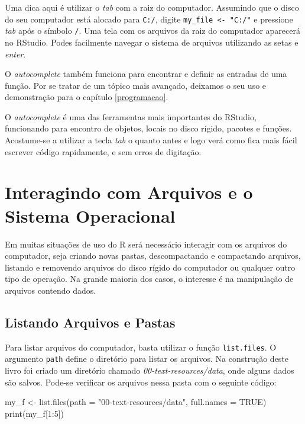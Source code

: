 \documentclass[
  11pt,
]{book}
\newenvironment{Shaded}{\begin{snugshade}}{\end{snugshade}}
\newcommand{\AttributeTok}[1]{\textcolor[rgb]{0.61,0.61,0.61}{#1}}
\newcommand{\ConstantTok}[1]{\textcolor[rgb]{0,0,0}{#1}}
\newcommand{\DecValTok}[1]{\textcolor[rgb]{0.06,0.06,0.06}{#1}}
\newcommand{\FunctionTok}[1]{\textcolor[rgb]{0,0,0}{#1}}
\newcommand{\NormalTok}[1]{#1}
\newcommand{\OtherTok}[1]{\textcolor[rgb]{0.37,0.37,0.37}{#1}}
\newcommand{\SpecialCharTok}[1]{\textcolor[rgb]{0,0,0}{#1}}
\newcommand{\StringTok}[1]{\textcolor[rgb]{0.5,0.5,0.5}{#1}}
\newenvironment{rmdimportant}
{\begin{importantblock}

	} {\end{importantblock}}
\begin{document}
Uma dica aqui é utilizar o \emph{tab} com a raiz do computador. Assumindo que o disco do seu computador está alocado para \texttt{C:/}, digite \texttt{my\_file\ \textless{}-\ "C:/"} e pressione \emph{tab} após o símbolo \texttt{/}. Uma tela com os arquivos da raiz do computador aparecerá no RStudio. Podes facilmente navegar o sistema de arquivos utilizando as setas e \emph{enter}.

O \emph{autocomplete} também funciona para encontrar e definir as entradas de uma função. Por se tratar de um tópico mais avançado, deixamos o seu uso e demonstração para o capítulo \ref{programacao}.

\begin{rmdimportant}
O \emph{autocomplete} é uma das ferramentas mais importantes do RStudio,
funcionando para encontro de objetos, locais no disco rígido, pacotes e
funções. Acostume-se a utilizar a tecla \emph{tab} o quanto antes e logo
verá como fica mais fácil escrever código rapidamente, e sem erros de
digitação.
\end{rmdimportant}

\hypertarget{interagindo-com-arquivos-e-o-sistema-operacional}{%
\section{Interagindo com Arquivos e o Sistema Operacional}\label{interagindo-com-arquivos-e-o-sistema-operacional}}

Em muitas situações de uso do R será necessário interagir com os arquivos do computador, seja criando novas pastas, descompactando e compactando arquivos, listando e removendo arquivos do disco rígido do computador ou qualquer outro tipo de operação. Na grande maioria dos casos, o interesse é na manipulação de arquivos contendo dados.

\hypertarget{listando-arquivos-e-pastas}{%
\subsection{Listando Arquivos e Pastas}\label{listando-arquivos-e-pastas}}

Para listar arquivos do computador, basta utilizar o função \texttt{list.files}. O argumento \texttt{path} define o diretório para listar os arquivos. Na construção deste livro foi criado um diretório chamado \emph{00-text-resources/data}, onde alguns dados são salvos. Pode-se verificar os arquivos nessa pasta com o seguinte código:

\begin{Shaded}
\begin{Highlighting}[]
\NormalTok{my\_f }\OtherTok{\textless{}{-}} \FunctionTok{list.files}\NormalTok{(}\AttributeTok{path =} \StringTok{"00{-}text{-}resources/data"}\NormalTok{, }\AttributeTok{full.names =} \ConstantTok{TRUE}\NormalTok{)}
\FunctionTok{print}\NormalTok{(my\_f[}\DecValTok{1}\SpecialCharTok{:}\DecValTok{5}\NormalTok{])}
\end{Highlighting}
\end{Shaded}
\end{document}
